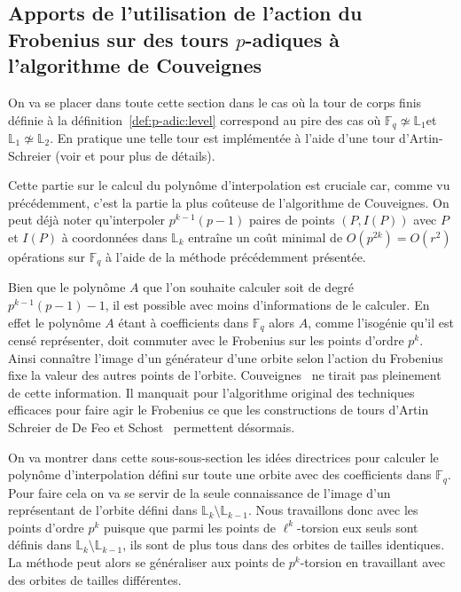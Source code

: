 \documentclass[10pt,a4paper]{book}
\theoremstyle{plain}
\theoremstyle{definition}
\theoremstyle{definition}
\theoremstyle{definition}
\theoremstyle{definition}
\theoremstyle{definition}
\theoremstyle{remark}
\theoremstyle{remark}
\theoremstyle{definition}
\begin{document}
\subsection{Apports de l'utilisation de l'action du Frobenius sur des tours $p$-adiques à l'algorithme de Couveignes}
\label{sub:fro:int}
On va se placer dans toute cette section dans le cas où la tour de corps
finis définie à la définition~\ref{def:p-adic:level} correspond au pire des cas où
$\mathbb{F}_q \not \simeq \mathbb{L}_1$et $\mathbb{L}_1 \not \simeq 
\mathbb{L}_2$. En pratique une telle tour est implémentée à l'aide d'une tour 
d'Artin-Schreier (voir \cite{DeFeo11} et \cite{DeFeo-Shost'12} pour plus de 
détails).

Cette partie sur le calcul du polynôme d'interpolation est cruciale car, comme vu précédemment, c'est la partie la plus coûteuse de l'algorithme de Couveignes. On peut déjà noter qu'interpoler $p^{k-1}(p-1)$ paires de points $(P,I(P))$ avec $P$ et $I(P)$ à coordonnées dans $\mathbb{L}_k$ entraîne un coût minimal de $O(p^{2k})=O(r^2)$ opérations sur $\mathbb{F}_q$ à l'aide de la méthode précédemment présentée. 

Bien que le polynôme $A$ que l'on souhaite calculer soit de degré $p^{k-1}
(p-1)-1$, il est possible avec moins d'informations de le calculer. En effet le
polynôme $A$ étant à coefficients dans $\mathbb{F}_q$ alors $A$, comme 
l'isogénie qu'il est censé représenter, doit commuter avec le Frobenius sur les
points d'ordre $p^k$. Ainsi connaître l'image d'un générateur d'une orbite 
selon l'action du Frobenius fixe la valeur des autres points de l'orbite. 
Couveignes~\cite{Couveignes96} ne tirait pas pleinement de cette information. 
Il manquait pour l'algorithme original des techniques efficaces pour faire agir
le Frobenius ce que les constructions de tours d'Artin Schreier de De Feo et 
Schost~\cite{DeFeo-Shost'12} permettent désormais.

On va montrer dans cette sous-sous-section les idées directrices pour calculer le polynôme d'interpolation défini sur toute une orbite avec des coefficients 
dans $\mathbb{F}_q$. Pour faire cela on va se servir de la seule connaissance 
de l'image d'un représentant de l'orbite défini dans $\mathbb{L}_k \setminus 
\mathbb{L}_{k-1}$. Nous travaillons donc avec les points d'ordre $p^k$ puisque que 
parmi les points de $\ell^k$-torsion eux seuls sont définis dans 
$\mathbb{L}_k \setminus \mathbb{L}_{k-1}$, ils sont de plus tous dans des orbites 
de tailles identiques. La méthode peut alors se généraliser aux points de 
$p^k$-torsion en travaillant avec des orbites de tailles différentes.
\end{document}
